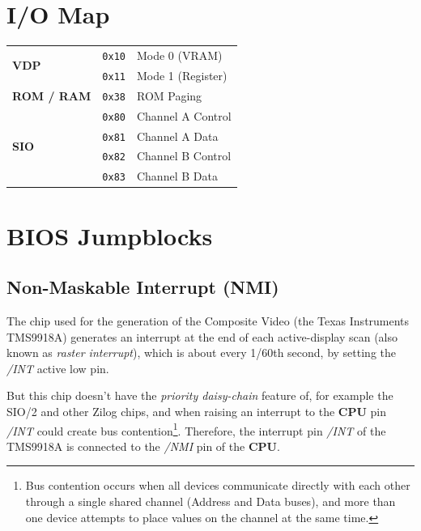 \documentclass[a4paper,11pt]{article}
\begin{document}
    \pagebreak
    \section{I/O Map}

    \begin{tabular}{l l l }
        \hline
        \multirow{2}{*}{\textbf{VDP}} & \texttt{0x10} & Mode 0 (VRAM)\\
        & \texttt{0x11} & Mode 1 (Register)\\
        \hline
        \textbf{ROM / RAM} & \texttt{0x38} & ROM Paging\\
        \hline
        \multirow{4}{*}{\textbf{SIO}} & \texttt{0x80} & Channel A Control\\
        & \texttt{0x81} & Channel A Data\\
        & \texttt{0x82} & Channel B Control\\
        & \texttt{0x83} & Channel B Data\\
        \hline
    \end{tabular}

    \pagebreak
    \section{BIOS Jumpblocks}

    \subsection{Non-Maskable Interrupt (NMI)}

    The chip used for the generation of the Composite Video (the Texas
    Instruments TMS9918A) generates an interrupt at the end of each
    active-display scan (also known as \textit{raster interrupt}), which is
    about every 1/60th second, by setting the \textit{/INT} active low pin.

    But this chip doesn't have the \textit{priority daisy-chain} feature of, for
    example the SIO/2 and other Zilog chips, and when raising an interrupt to
    the \textbf{CPU} pin \textit{/INT} could create bus contention\footnote{Bus
    contention occurs when all devices communicate directly with each other
    through a single shared channel (Address and Data buses), and more than one
    device attempts to place values on the channel at the same time.}. Therefore,
    the interrupt pin \textit{/INT} of the TMS9918A is connected to the
    \textit{/NMI} pin of the \textbf{CPU}.
\end{document}
